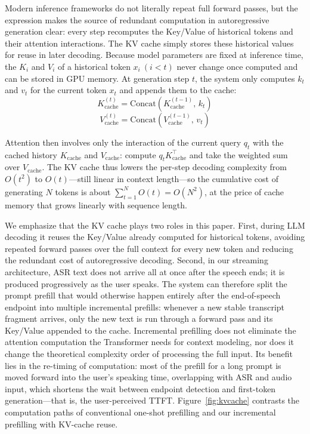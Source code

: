 \documentclass[a4paper,11pt]{article}
\begin{document}
Modern inference frameworks do not literally repeat full forward passes, but the expression makes the source of redundant computation in autoregressive generation clear: every step recomputes the Key/Value of historical tokens and their attention interactions. The KV cache simply stores these historical values for reuse in later decoding. Because model parameters are fixed at inference time, the $K_i$ and $V_i$ of a historical token $x_i\ (i<t)$ never change once computed and can be stored in GPU memory. At generation step $t$, the system only computes $k_t$ and $v_t$ for the current token $x_t$ and appends them to the cache:
\begin{equation}
K_{\mathrm{cache}}^{(t)}=\mathrm{Concat}\left(K_{\mathrm{cache}}^{(t-1)},\,k_t\right)
\label{eq:kcache}
\end{equation}
\begin{equation}
V_{\mathrm{cache}}^{(t)}=\mathrm{Concat}\left(V_{\mathrm{cache}}^{(t-1)},\,v_t\right)
\label{eq:vcache}
\end{equation}

Attention then involves only the interaction of the current query $q_t$ with the cached history $K_{\mathrm{cache}}$ and $V_{\mathrm{cache}}$: compute $q_t K_{\mathrm{cache}}^{\top}$ and take the weighted sum over $V_{\mathrm{cache}}$. The KV cache thus lowers the per-step decoding complexity from $O(t^{2})$ to $O(t)$---still linear in context length---so the cumulative cost of generating $N$ tokens is about $\sum_{t=1}^{N}O(t)=O(N^{2})$, at the price of cache memory that grows linearly with sequence length.

We emphasize that the KV cache plays two roles in this paper. First, during LLM decoding it reuses the Key/Value already computed for historical tokens, avoiding repeated forward passes over the full context for every new token and reducing the redundant cost of autoregressive decoding. Second, in our streaming architecture, ASR text does not arrive all at once after the speech ends; it is produced progressively as the user speaks. The system can therefore split the prompt prefill that would otherwise happen entirely after the end-of-speech endpoint into multiple incremental prefills: whenever a new stable transcript fragment arrives, only the new text is run through a forward pass and its Key/Value appended to the cache. Incremental prefilling does not eliminate the attention computation the Transformer needs for context modeling, nor does it change the theoretical complexity order of processing the full input. Its benefit lies in the re-timing of computation: most of the prefill for a long prompt is moved forward into the user's speaking time, overlapping with ASR and audio input, which shortens the wait between endpoint detection and first-token generation---that is, the user-perceived TTFT. Figure~\ref{fig:kvcache} contrasts the computation paths of conventional one-shot prefilling and our incremental prefilling with KV-cache reuse.
\end{document}
